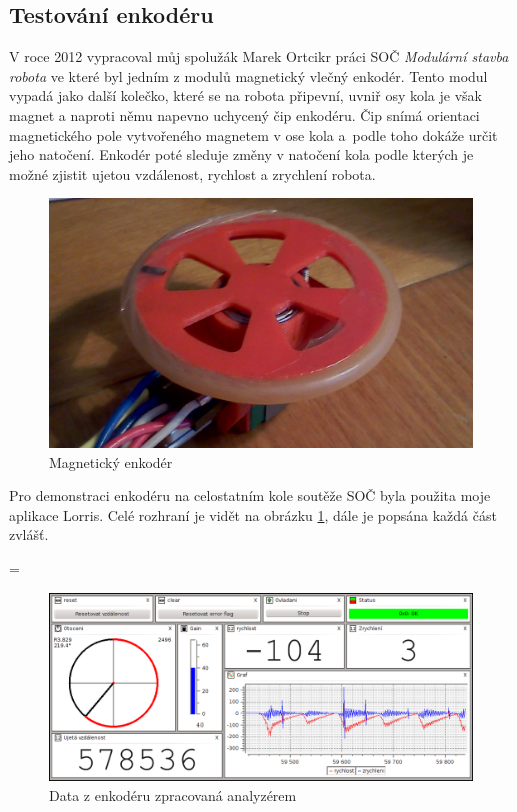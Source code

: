 \documentclass[12pt, a4paper, oneside]{article}
\newcommand{\It}{\textit}  %
\begin{document}
\subsection{Testování enkodéru}
V roce 2012 vypracoval můj spolužák Marek Ortcikr práci SOČ \It{Modulární stavba robota} ve které byl jedním z modulů magnetický vlečný enkodér. Tento modul vypadá jako další kolečko, které se na robota připevní, uvniř osy kola je však magnet a naproti němu napevno uchycený čip enkodéru. Čip snímá orientaci magnetického pole vytvořeného magnetem v ose kola a~podle toho dokáže určit jeho natočení. Enkodér poté sleduje změny v natočení kola podle kterých je možné zjistit ujetou vzdálenost, rychlost a zrychlení robota.
\begin{figure}[H]
\begin{center}
\includegraphics[width=\textwidth]{img/enc_real.png}
\caption{Magnetický enkodér}
\end{center}
\end{figure}
Pro demonstraci enkodéru na celostatním kole soutěže SOČ byla použita moje aplikace Lorris. Celé rozhraní je vidět na obrázku \ref{analyzer_all}, dále je popsána každá část zvlášť.

\newpage
\pagestyle{empty}
\textheight=\paperheight
\voffset=-130pt
\begin{landscape}
\begin{figure}[h]
\begin{center}
\includegraphics{img/enc_full.png}
\caption{Data z enkodéru zpracovaná analyzérem}
\label{analyzer_all}
\end{center}
\end{figure}
\end{landscape}
\end{document}
